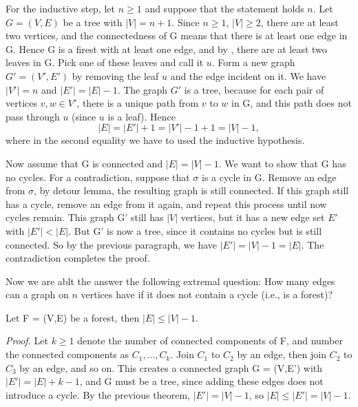 \documentclass{tufte-handout}
\begin{document}
For the inductive step, let \( n \geq 1 \) and suppose that the statement holds \( n \). Let
\( G = (V,E) \) be a tree with \(\left|V\right| = n+1\). Since \( n\geq 1  \), \( \left|V\right| \geq 2 \),
there are at least two vertices, and the connectedness of G means that there is at least one edge in G.
Hence G is a firest with at least one edge, and by , there are at least two
leaves in G. Pick one of these leaves and call it \( u \). Form a new graph \( G' = (V',E') \) by removing
the leaf \( u \) and the edge incident on it. We have \(\left|V'\right| = n\) and \(\left|E'\right| = \left|E\right|-1\).
The graph \( G' \) is a tree, because for each pair of vertices \( v,w \in V' \), there is a unique path from \( v \) to \( w \)
in G, and this path does not pass through \( u \) (since \( u \) is a leaf). Hence
\[ \left|E\right| = \left|E'\right| + 1 = \left|V'\right| - 1 + 1 = \left|V\right| - 1, \]
where in the second equality we have to used the inductive hypothesis. 

Now assume that G is connected and \(\left|E\right| = \left|V\right| - 1\). We want to show
that G has no cycles. For a contradiction, suppose that \(\sigma\) is a cycle in G. 
Remove an edge from \(\sigma\), by detour lemma, the resulting graph is still connected.
If this graph still has a cycle, remove an edge from it again, and repeat this process until now cycles remain.
This graph G' still has \(\left|V\right|\) vertices, but it has a new edge set \( E' \) with \(\left|E'\right| < \left|E\right|\).
But G' is now a tree, since it contains no cycles but is still connected. So by the
previous paragraph, we have \(\left|E'\right| = \left|V\right| - 1 = \left|E\right|\).
The contradiction completes the proof. \qedsymbol

Now we are ablt the answer the following extremal question: How many edges
can a graph on \( n \) vertices have if it does not contain a cycle (i.e., is a forest)?

\begin{Corollary}
    Let F = (V,E) be a forest, then \(\left|E\right| \leq \left|V\right| - 1\).
\end{Corollary}
\textit{Proof.} Let \( k \geq 1\) denote the number of connected components of F, and
number the connected components as \( C_1, \ldots, C_k \). Join \( C_1 \) to \( C_2 \) by an edge,
then join \( C_2 \) to \( C_3 \) by an edge, and so on. This creates a connected graph G = (V,E')
with \( \left|E'\right| = \left|E\right| + k - 1 \), and G must be a tree, since adding
these edges does not introduce a cycle. By the previous theorem, 
\(\left|E'\right| = \left|V\right| - 1\), so \(\left|E\right| \leq \left|E'\right| = \left|V\right| - 1\). \qedsymbol
\end{document}
